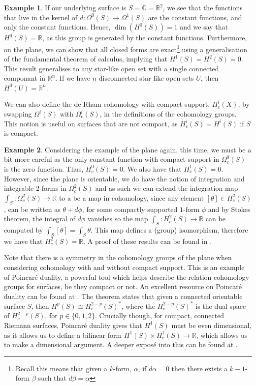 \documentclass[11pt]{report}
\theoremstyle{definition}
\newtheorem*{example*}{Example}
\begin{document}
\begin{example*}
  If our underlying surface is $S=\mathbb{C}=\mathbb{R}^2$, we see that the functions that live in the kernel of $d:\Omega^0(S)\rightarrow\Omega^1(S)$ are the constant functions, and only the constant functions. Hence, $\dim(H^0(S)) = 1$ and we say that $H^0(S)=\mathbb{R}$, as this group is generated by the constant functions. Furthermore, on the plane, we can show that all closed forms are exact\footnote{Recall this means that given a $k$-form, $\alpha$, if $d\alpha = 0$ then there exists a $k-1$-form $\beta$ such that $d\beta = \alpha$} using a generalisation of the fundamental theorem of calculus, implying that $H^1(S)=H^2(S) = 0$. This result generalises to any star-like open set with a single connected componant in $\mathbb{R}^n$. If we have $n$ disconnected star like open sets $U$, then $H^0(U)=\mathbb{R}^n$.
\end{example*}
We can also define the de-Rham cohomology with compact support, $H^i_c(X)$, by swapping $\Omega^i(S)$ with $\Omega_c^i(S)$, in the definitions of the cohomology groups. This notion is useful on surfaces that are not compact, as $H^i_c(S) = H^i(S)$ if $S$ is compact.
\begin{example*}
  Considering the example of the plane again, this time, we must be a bit more careful as the only constant function with compact support in $\Omega^0_c(S)$ is the zero function. Thus, $H^0_c(S)=0$. We also have that $H^1_c(S)=0$. However, since the plane is orientable, we do have the notion of integration and integrable $2$-forms in $\Omega^2_c(S)$ and as such we can extend the integration map $\int_S : \Omega^2_c(S) \rightarrow \mathbb{R}$ to a be a map in cohomology, since any element $[\theta] \in H^2_c(S)$, can be written as $\theta + d\phi$, for some compactly supported $1$-form $\phi$ and by Stokes theorem, the integral of $d\phi$ vanishes so the map $\int_S:H^2_c(S)\rightarrow \mathbb{R}$
  can be computed by $\int_S [\theta] = \int_S \theta$. This map defines a (group) isomorphism, therefore we have that $H^2_c(S)=\mathbb{R}$. A proof of these results can be found in \cite[Theorem 10.13]{calcohomo}.
\end{example*}
Note that there is a symmetry in the cohomology groups of the plane when considering cohomology with and without compact support. This is an example of Poincar\'{e} duality, a powerful tool which helps describe the relation cohomology groups for surfaces, be they compact or not. An excellent resource on Poincar\'{e} duality can be found at \cite[Chapter 13]{calcohomo}. The theorem states that given a connected orientable surface $S$, then $H^p(S) \cong H^{2-p}_c(S)^*$, where the $H^{2-p}_c(S)^*$ is the dual space of $H^{2-p}_c(S)$, for $p \in \{0,1,2\}$.
Crucially though, for compact, connected Riemann surfaces, Poincar\'{e} duality gives that $H^1(S)$ must be even dimensional, as it allows us to define a bilinear form $H^1(S)\times H^1_c(S) \rightarrow \mathbb{R}$, which allows us to make a dimensional argument. A deeper expos\'{e} into this can be found at \cite[p.130]{calcohomo}.
\end{document}
